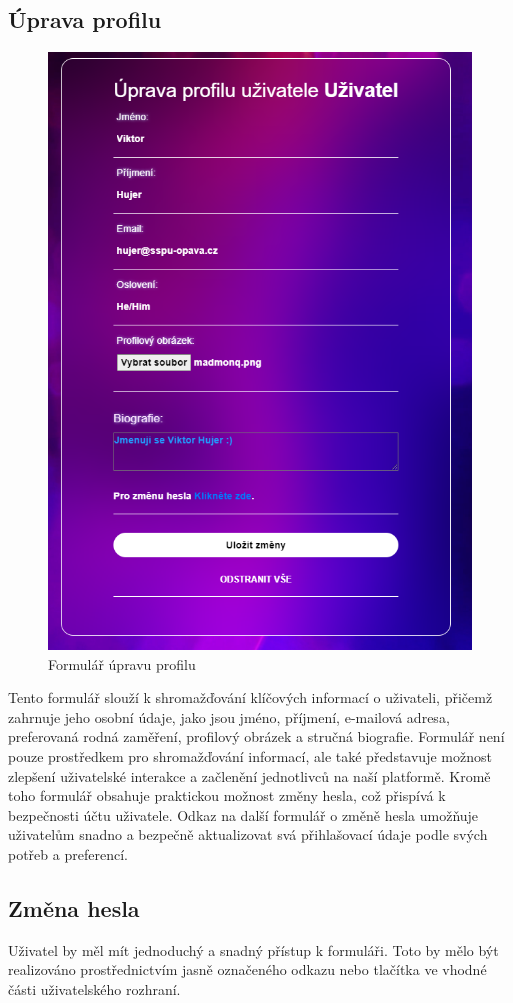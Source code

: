 \documentclass[12pt, a4paper,
twoside,        %
openright
]{report}
\begin{document}
\subsection[Úprava profilu]{Úprava profilu}
\begin{figure}[h]
			\centering
			\includegraphics[width=0.5\linewidth]{image/profile.png} 
			\caption{Formulář úpravu profilu}
		\end{figure}
		
Tento formulář slouží k shromažďování klíčových informací o uživateli, přičemž zahrnuje jeho osobní údaje, jako jsou jméno, příjmení, e-mailová adresa, preferovaná rodná zaměření, profilový obrázek a stručná biografie. Formulář není pouze prostředkem pro shromažďování informací, ale také představuje možnost zlepšení uživatelské interakce a začlenění jednotlivců na naší platformě. Kromě toho formulář obsahuje praktickou možnost změny hesla, což přispívá k bezpečnosti účtu uživatele. Odkaz na další formulář o změně hesla umožňuje uživatelům snadno a bezpečně aktualizovat svá přihlašovací údaje podle svých potřeb a preferencí.
\subsection[Změna hesla]{Změna hesla}
Uživatel by měl mít jednoduchý a snadný přístup k formuláři. Toto by mělo být realizováno prostřednictvím jasně označeného odkazu nebo tlačítka ve vhodné části uživatelského rozhraní.
\end{document}
